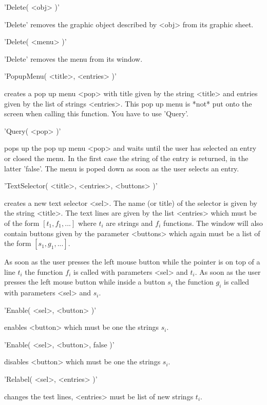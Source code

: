 'Delete( <obj> )'

'Delete' removes the graphic object described by <obj> from its graphic
sheet.

'Delete( <menu> )'

'Delete' removes the menu from its window.


'PopupMenu( <title>, <entries> )'

creates a  pop up menu  <pop> with title given  by the string <title> and
entries  given by the list  of  strings <entries>.   This  pop up menu is
*not* put onto the  screen when calling this  function.  You have  to use
'Query'.

'Query( <pop> )'

pops  up the pop up menu  <pop> and waits until the  user has selected an
entry or closed the menu.   In the first case  the string of the entry is
returned, in the latter 'false'.  The  menu is poped down  as soon as the
user selects an entry.


'TextSelector( <title>, <entries>, <buttons> )'

creates a new text  selector <sel>.  The name (or  title) of the selector
is given by the  string <title>.  The text  lines  are given by  the list
<entries> which must be  of the form $[  t_1, f_1, ...]$ where $t_i$  are
strings and $f_i$ functions.  The window  will also contain buttons given
by the parameter <buttons> which again must be a list of the form $[ s_1,
g_1, ... ]$.

As soon as the user presses the left mouse button while the pointer is on
top of a line  $t_i$ the function $f_i$ is  called with  parameters <sel>
and $t_i$.   As soon  as the  user presses  the  left mouse  button while
inside a button $s_i$ the function  $g_i$ is called with parameters <sel>
and $s_i$.

'Enable( <sel>, <button> )'

enables <button> which must be one the strings $s_i$.

'Enable( <sel>, <button>, false )'

disables <button> which must be one the strings $s_i$.

'Relabel( <sel>, <entries> )'

changes the test lines, <entries> must be list of new strings $t_i$.

